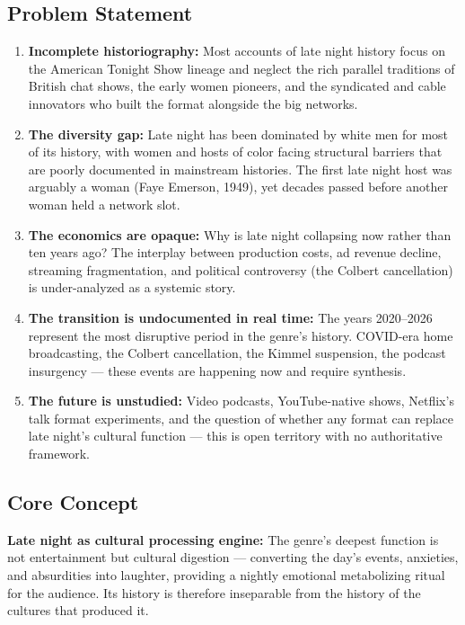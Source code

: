 \documentclass[11pt,letterpaper]{article}
\begin{document}
\subsection{Problem Statement}

\begin{enumerate}[leftmargin=1.5em]
  \item \textbf{Incomplete historiography:} Most accounts of late night history focus on the American Tonight Show lineage and neglect the rich parallel traditions of British chat shows, the early women pioneers, and the syndicated and cable innovators who built the format alongside the big networks.
  \item \textbf{The diversity gap:} Late night has been dominated by white men for most of its history, with women and hosts of color facing structural barriers that are poorly documented in mainstream histories. The first late night host was arguably a woman (Faye Emerson, 1949), yet decades passed before another woman held a network slot.
  \item \textbf{The economics are opaque:} Why is late night collapsing now rather than ten years ago? The interplay between production costs, ad revenue decline, streaming fragmentation, and political controversy (the Colbert cancellation) is under-analyzed as a systemic story.
  \item \textbf{The transition is undocumented in real time:} The years 2020--2026 represent the most disruptive period in the genre's history. COVID-era home broadcasting, the Colbert cancellation, the Kimmel suspension, the podcast insurgency --- these events are happening now and require synthesis.
  \item \textbf{The future is unstudied:} Video podcasts, YouTube-native shows, Netflix's talk format experiments, and the question of whether any format can replace late night's cultural function --- this is open territory with no authoritative framework.
\end{enumerate}

\subsection{Core Concept}

\textbf{Late night as cultural processing engine:} The genre's deepest function is not entertainment but cultural digestion --- converting the day's events, anxieties, and absurdities into laughter, providing a nightly emotional metabolizing ritual for the audience. Its history is therefore inseparable from the history of the cultures that produced it.
\end{document}
